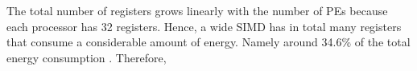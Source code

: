 The total number of registers grows linearly with the number of PEs because each processor has 32 registers. Hence, a wide SIMD has in total many registers that consume a considerable amount of energy. Namely around 34.6\% of the total energy consumption \cite{dongrio1}. Therefore, 








